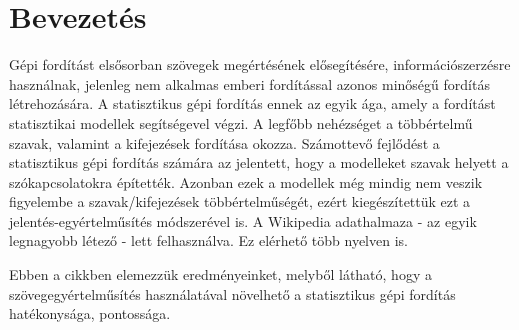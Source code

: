 \section{Bevezetés}
Gépi fordítást elsősorban szövegek megértésének elősegítésére, információszerzésre használnak, jelenleg nem alkalmas emberi fordítással azonos minőségű fordítás létrehozására. A statisztikus gépi fordítás ennek az egyik ága, amely a fordítást statisztikai modellek segítségevel végzi.
A legfőbb nehézséget a többértelmű szavak, valamint a kifejezések fordítása okozza.
Számottevő fejlődést a statisztikus gépi fordítás számára az jelentett, hogy a modelleket szavak helyett a szókapcsolatokra építették. Azonban ezek a modellek még mindig nem veszik figyelembe a szavak/kifejezések többértelműségét, ezért kiegészítettük ezt a jelentés-egyértelműsítés módszerével is. A Wikipedia adathalmaza - az egyik legnagyobb létező - lett felhasználva. Ez elérhető több nyelven is. 

Ebben a cikkben elemezzük eredményeinket, melyből látható, hogy a szövegegyértelműsítés használatával növelhető a statisztikus gépi fordítás hatékonysága, pontossága.